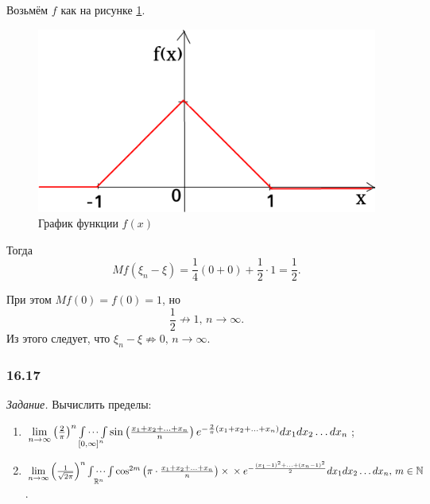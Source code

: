 Возьмём $f$ как на рисунке \ref{fig:1615}.

\begin{figure}[h!]
  \centering
  \includegraphics[width=.4\textwidth]{./pictures/16_15.png}
  \caption{График функции $f \left( x \right) $}
  \label{fig:1615}
\end{figure}

Тогда
$$Mf \left( \xi_n - \xi \right) =
\frac{1}{4} \left( 0 + 0 \right) + \frac{1}{2} \cdot 1 =
\frac{1}{2}.$$

При этом $Mf \left( 0 \right) = f \left( 0 \right) = 1$, но
$$ \frac{1}{2} \not \to 1, \,
n \rightarrow \infty.$$
Из этого следует, что $ \xi_n - \xi \not \Rightarrow 0, \, n \rightarrow \infty $.

\subsubsection*{16.17}

\textit{Задание.} Вычислить пределы:
\begin{enumerate}[label=\alph*)]
\item $ \lim \limits_{n \to \infty } \left( \frac{2}{ \pi } \right)^n
\idotsint \limits_{ \left[ 0, \infty \right]^n}
\sin \left( \frac{x_1 + x_2 + \dotsc + x_n}{n} \right)
e^{- \frac{2}{ \pi } \left( x_1 + x_2 + \dotsc + x_n \right) }
dx_1 dx_2 \dotsc dx_n$;
\item $ \lim \limits_{n \to \infty } \left( \frac{1}{ \sqrt{2 \pi }} \right)^n
\idotsint \limits_{ \mathbb{R}^n} \cos^{2m}
\left( \pi \cdot \frac{x_1 + x_2 + \dotsc + x_n}{n} \right) \times \\
\times e^{- \frac{ \left( x_1 - 1 \right)^2 + \dotsc + \left( x_n - 1 \right)^2}{2}}
dx_1 dx_2 \dotsc dx_n, \,
m \in \mathbb{N}$.
\end{enumerate}

